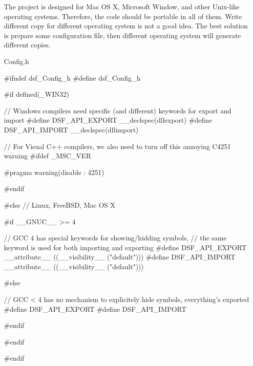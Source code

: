 The project is designed for Mac O\+S X, Microsoft Window, and other Unix-\/like operating systems. Therefore, the code should be portable in all of them. Write different copy for different operating system is not a good idea. The best solution is prepare some configuration file, then different operating system will generate different copies. \begin{DoxyParagraph}{Config.h}

\begin{DoxyCode}
\textcolor{preprocessor}{#ifndef dsf\_Config\_h}
\textcolor{preprocessor}{#define dsf\_Config\_h}

\textcolor{preprocessor}{#if defined(\_WIN32)}

\textcolor{comment}{// Windows compilers need specific (and different) keywords for export and import}
\textcolor{preprocessor}{#define DSF\_API\_EXPORT \_\_declspec(dllexport)}
\textcolor{preprocessor}{#define DSF\_API\_IMPORT \_\_declspec(dllimport)}

\textcolor{comment}{// For Visual C++ compilers, we also need to turn off this annoying C4251 warning}
\textcolor{preprocessor}{#ifdef \_MSC\_VER}

\textcolor{preprocessor}{#pragma warning(disable : 4251)}

\textcolor{preprocessor}{#endif}

\textcolor{preprocessor}{#else // Linux, FreeBSD, Mac OS X}

\textcolor{preprocessor}{#if \_\_GNUC\_\_ >= 4}

\textcolor{comment}{// GCC 4 has special keywords for showing/hidding symbols,}
\textcolor{comment}{// the same keyword is used for both importing and exporting}
\textcolor{preprocessor}{#define DSF\_API\_EXPORT \_\_attribute\_\_ ((\_\_visibility\_\_ ("default")))}
\textcolor{preprocessor}{#define DSF\_API\_IMPORT \_\_attribute\_\_ ((\_\_visibility\_\_ ("default")))}

\textcolor{preprocessor}{#else}

\textcolor{comment}{// GCC < 4 has no mechanism to explicitely hide symbols, everything's exported}
\textcolor{preprocessor}{#define DSF\_API\_EXPORT}
\textcolor{preprocessor}{#define DSF\_API\_IMPORT}

\textcolor{preprocessor}{#endif}

\textcolor{preprocessor}{#endif}


\textcolor{preprocessor}{#endif}
\end{DoxyCode}
 
\end{DoxyParagraph}
